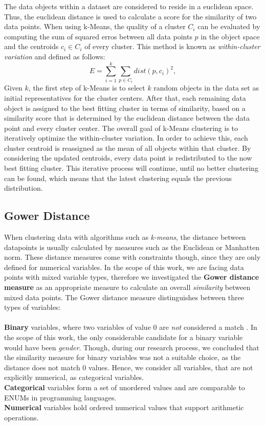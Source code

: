 \documentclass[runningheads]{llncs}
\begin{document}
	The data objects within a dataset are considered to reside in a euclidean space. Thus, the euclidean distance is used to calculate a score for the similarity of two data points. When using k-Means, the quality of a cluster $C_i$ can be evaluated by computing the sum of squared erros between all data points $p$ in the object space and the centroids $c_i \in C_i$ of every cluster. This method is known as \textit{within-cluster variation} \cite{data_mining} and defined as follows: 
	\begin{equation}
		E = \sum_{i=1}^{k} \sum_{p \in C_i} dist(p, c_i)^2,
	\end{equation}
	Given $k$, the first step of k-Means is to select $k$ random objects in the data set as initial representatives for the cluster centers. After that, each remaining data object is assigned to the best fitting cluster in terms of similarity, based on a similarity score that is determined by the euclidean distance between the data point and every cluster center. The overall goal of k-Means clustering is to iteratively optimize the within-cluster variation. In order to achieve this, each cluster centroid is reassigned as the mean of all objects within that cluster. By considering the updated centroids, every data point is redistributed to the now best fitting cluster. This iterative process will continue, until no better clustering can be found, which means that the latest clustering equals the previous distribution.
	
	\subsection{Gower Distance}\label{gower}
	
	When clustering data with algorithms such as \textit{k-means}, the distance between datapoints is usually calculated by measures such as the Euclidean or Manhatten norm. These distance measures come with constraints though, since they are only defined for numerical variables. In the scope of this work, we are facing data points with mixed variable types, therefore we investigated the \textbf{Gower distance measure} as an appropriate measure to calculate an overall \textit{similarity} between mixed data points. The Gower distance measure distinguishes between three types of variables:\\
	\\ \textbf{Binary} variables, where two variables of value 0 are \textit{not} considered a match \cite{gower1971general}. In the scope of this work, the only considerable candidate for a binary variable would have been \textit{gender}. Though, during our research process, we concluded that the similarity measure for binary variables was not a suitable choice, as the distance does not match 0 values. Hence, we consider all variables, that are not explicitly numerical, as categorical variables.\\
	\textbf{Categorical} variables form a set of unordered values and are comparable to ENUMs in programming languages.\\	
	\textbf{Numerical} variables hold ordered numerical values that support arithmetic operations.
	
\end{document}
